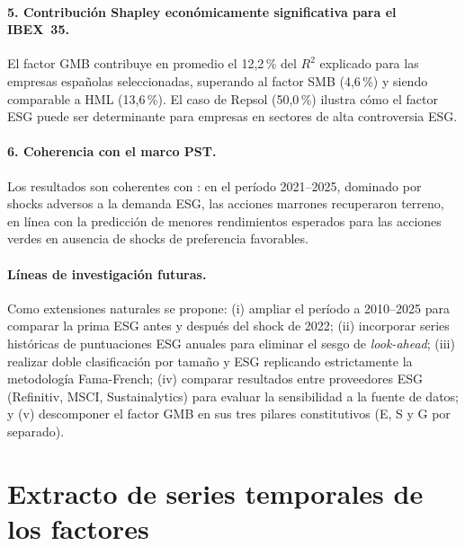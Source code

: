 \documentclass[12pt, a4paper]{article}
\begin{document}
\paragraph{5. Contribuci\'on Shapley econ\'omicamente significativa para el IBEX~35.}
El factor GMB contribuye en promedio el 12{,}2\,\% del $R^2$ explicado para las empresas
espa\~nolas seleccionadas, superando al factor SMB (4{,}6\,\%) y siendo comparable a HML
(13{,}6\,\%). El caso de Repsol (50{,}0\,\%) ilustra c\'omo el factor ESG puede ser
determinante para empresas en sectores de alta controversia ESG.

\paragraph{6. Coherencia con el marco PST.}
Los resultados son coherentes con \textcites{pastor2021}{pastor2022}: en el per\'iodo
2021--2025, dominado por shocks adversos a la demanda ESG, las acciones marrones
recuperaron terreno, en l\'inea con la predicci\'on de menores rendimientos esperados
para las acciones verdes en ausencia de shocks de preferencia favorables.

\paragraph{L\'ineas de investigaci\'on futuras.}
Como extensiones naturales se propone: (i) ampliar el per\'iodo a 2010--2025 para
comparar la prima ESG antes y despu\'es del shock de 2022; (ii) incorporar series
hist\'oricas de puntuaciones ESG anuales para eliminar el sesgo de \textit{look-ahead};
(iii) realizar doble clasificaci\'on por tama\~no y ESG replicando estrictamente la
metodolog\'ia Fama-French; (iv) comparar resultados entre proveedores ESG (Refinitiv,
MSCI, Sustainalytics) para evaluar la sensibilidad a la fuente de datos; y
(v) descomponer el factor GMB en sus tres pilares constitutivos (E, S y G por separado).

\newpage
\nocite{*}
\printbibliography[title={Referencias Bibliogr\'aficas}]

\newpage
\appendix

\section{Extracto de series temporales de los factores}
\label{app:series}
\end{document}
